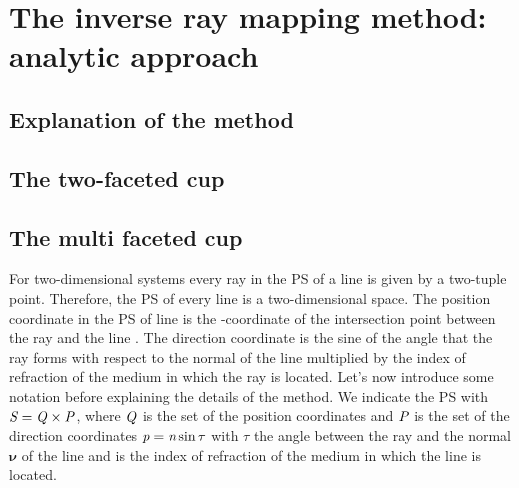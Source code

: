 
\chapter{The inverse ray mapping method: analytic approach}
\section{Explanation of the method}
\section{The two-faceted cup}
\section{The multi faceted cup}
For two-dimensional systems every ray in the PS of a line is given by a two-tuple point. Therefore, the PS of every line is a two-dimensional space.
The position coordinate in the PS of line  is the -coordinate of the intersection point between the ray and the line .
The direction coordinate is the sine of the angle that the ray forms with respect to the normal of the line  multiplied by the index of refraction of the medium in which the ray is located.
Let's now introduce some notation before explaining the details of the method. We indicate the PS with $\emph{S}_{\textit{}}=\emph{Q}_{\textit{}}\times\emph{P}_{\textit{}}$,
where $\emph{Q}_{\textit{}}$ is the set of the position coordinates  and $\emph{P}_{\textit{}}$ is the set of the direction coordinates $\textit{p}=\textit{n}\sin{\tau}$ with $\tau$ the angle between the ray and the normal \textit{$\boldsymbol{\nu}$} of the line and  is the index of refraction of the medium in which the line is located.  
